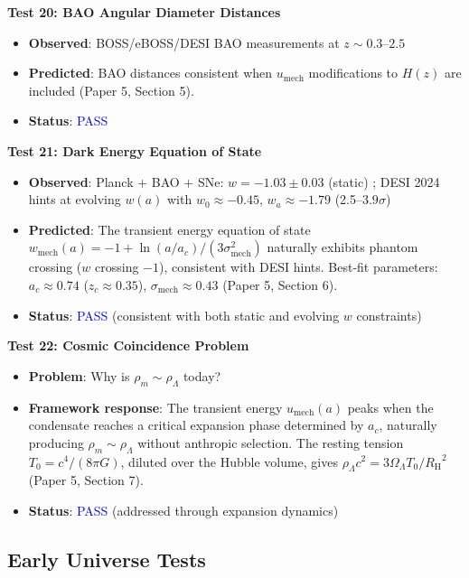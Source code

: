 \documentclass[11pt,a4paper]{article}
\newcommand{\Tzero}{\ensuremath{T_0}}
\newcommand{\RH}{\ensuremath{R_{\mathrm{H}}}}
\newcommand{\umech}{\ensuremath{u_{\mathrm{mech}}}}
\newcommand{\wmech}{\ensuremath{w_{\mathrm{mech}}}}
\theoremstyle{definition}
\theoremstyle{remark}
\begin{document}
\textbf{Test 20: BAO Angular Diameter Distances}

\begin{itemize}[leftmargin=*, itemsep=0.1em]
\item \textbf{Observed}: BOSS/eBOSS/DESI BAO measurements at $z \sim 0.3$--$2.5$
\item \textbf{Predicted}: BAO distances consistent when $\umech$ modifications to $H(z)$ are included (Paper 5, Section 5).
\item \textbf{Status}: \textcolor{blue}{PASS}
\end{itemize}

\textbf{Test 21: Dark Energy Equation of State}

\begin{itemize}[leftmargin=*, itemsep=0.1em]
\item \textbf{Observed}: Planck + BAO + SNe: $w = -1.03 \pm 0.03$ (static) \cite{Planck2018}; DESI 2024 \cite{DESI2024} hints at evolving $w(a)$ with $w_0 \approx -0.45$, $w_a \approx -1.79$ (2.5--$3.9\sigma$)
\item \textbf{Predicted}: The transient energy equation of state $\wmech(a) = -1 + \ln(a/a_c)/(3\sigma_{\mathrm{mech}}^2)$ naturally exhibits phantom crossing ($w$ crossing $-1$), consistent with DESI hints. Best-fit parameters: $a_c \approx 0.74$ ($z_c \approx 0.35$), $\sigma_{\mathrm{mech}} \approx 0.43$ (Paper 5, Section 6).
\item \textbf{Status}: \textcolor{blue}{PASS} (consistent with both static and evolving $w$ constraints)
\end{itemize}

\textbf{Test 22: Cosmic Coincidence Problem}

\begin{itemize}[leftmargin=*, itemsep=0.1em]
\item \textbf{Problem}: Why is $\rho_m \sim \rho_\Lambda$ today?
\item \textbf{Framework response}: The transient energy $\umech(a)$ peaks when the condensate reaches a critical expansion phase determined by $a_c$, naturally producing $\rho_m \sim \rho_\Lambda$ without anthropic selection. The resting tension $\Tzero = c^4/(8\pi G)$, diluted over the Hubble volume, gives $\rho_\Lambda c^2 = 3\Omega_\Lambda \Tzero/\RH^2$ (Paper 5, Section 7).
\item \textbf{Status}: \textcolor{blue}{PASS} (addressed through expansion dynamics)
\end{itemize}

\subsection{Early Universe Tests}
\label{sec:tests_early}
\end{document}
